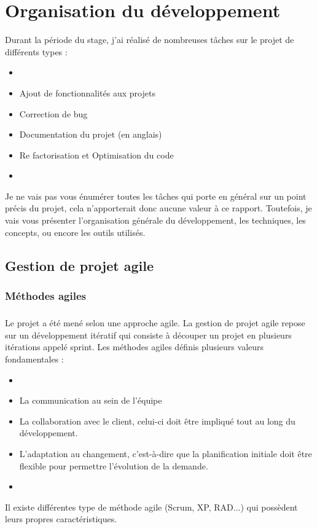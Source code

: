 \chapter{Organisation du développement}
Durant la période du stage, j'ai réalisé de nombreuses tâches sur le projet de différents types : 
\begin{itemize}
\item[]
\item Ajout de fonctionnalités aux projets
\item Correction de bug
\item Documentation du projet (en anglais)
\item Re factorisation et Optimisation du code
\item[]
\end{itemize}

Je ne vais pas vous énumérer toutes les tâches qui porte en général sur un point précis du projet,  cela n'apporterait donc aucune valeur à ce rapport. Toutefois, je vais vous présenter l'organisation générale du développement, les techniques, les concepts, ou encore les outils utilisés.

\section{Gestion de projet agile}
\subsection{Méthodes agiles}
\paragraph{}
Le projet a été mené selon une approche agile. La gestion de projet agile repose sur un développement itératif qui consiste à découper un projet en plusieurs itérations appelé sprint. Les méthodes agiles définis plusieurs valeurs fondamentales : 
\begin{itemize}
         \item[]
\item La communication au sein de l'équipe
\item La collaboration avec le client, celui-ci doit être impliqué tout au long du développement.
\item L'adaptation au changement, c'est-à-dire que la planification initiale doit être flexible pour permettre l'évolution de la demande. 
         \item[]
\end{itemize}
Il existe différentes type de méthode agile (Scrum, XP, RAD...) qui possèdent leurs propres caractéristiques.

